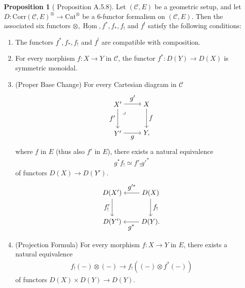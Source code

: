 \documentclass[a4paper,dvipdfmx,11pt,reqno]{amsart}
\DeclareMathOperator{\Hom}{Hom}
\newcommand{\C}{\mathcal{C}}
\newcommand{\Cat}{\mathrm{Cat}}
\newcommand{\Corr}{\mathrm{Corr}}
\theoremstyle{definition}
\newtheorem{proposition}[theorem]{Proposition}
\begin{document}
\begin{proposition}[\cite{Mann22} Proposition A.5.8] \label{Mann.prop.A.5.8}
  Let $(\C,E)$ be a geometric setup, and let $ D : \Corr(\C,E)^{\otimes} \to \Cat^{\otimes}$ be a 6-functor formalism on $(\C,E)$.
  Then the associated six functors $\otimes, \underline{\Hom}, f^{*}, f_{*}, f_{!}$ and $f^{!}$ satisfy the following conditions:
  \begin{enumerate}
    \item The functors $f^{*}, f_{\ast}, f_{!}$ and $f^{!}$ are compatible with composition.
    \item For every morphism $f : X \to Y$ in $\C$, the functor $f^{*} : D(Y) \to D(X)$ is symmetric monoidal.
    \item (Proper Base Change) For every Cartesian diagram in $\C$ 
    \[\begin{tikzpicture}[auto,->] 
      \node (tl) at (0,1.5) {$X'$}; 
      \node (tr) at (1.5,1.5) {$X$};
      \node (bl) at (0,0) {$Y'$}; 
      \node (br) at (1.5,0) {$Y,$}; 
      \draw (tl) -- node {$g'$} (tr); 
      \draw (bl) -- node[swap] {$g$} (br); 
      \draw (tl) -- node[swap] {$f'$} (bl);
      \draw (tr) -- node {$f$} (br); 
      \node at ([xshift=0.0cm, yshift=-0.2cm] tl.south east) {$\lrcorner$};
    \end{tikzpicture}\]
    where $f$ in $E$ (thus also $f'$ in $E$), there exists a natural equivalence
    \begin{align*}
      g^{*}f_{!} \simeq f'_{!}g'^{*}
    \end{align*}
    of functors $D(X) \to D(Y')$.
    \[\begin{tikzpicture}[auto,->] 
      \node (tl) at (0,1.5) {$D(X')$}; 
      \node (tr) at (2,1.5) {$D(X)$};
      \node (bl) at (0,0) {$D(Y')$}; 
      \node (br) at (2,0) {$D(Y).$}; 
      \draw (tr) -- node[swap] {$g'^{*}$} (tl); 
      \draw (br) -- node {$g^{*}$} (bl); 
      \draw (tl) -- node[swap] {$f'_{!}$} (bl);
      \draw (tr) -- node {$f_{!}$} (br); 
    \end{tikzpicture}\]
    \item (Projection Formula) For every morphism $f : X \to Y$ in $E$,
    there exists a natural equivalence
    \begin{align*}
      f_{!}(-) \otimes (-) \to f_{!}((-) \otimes f^{*}(-))
    \end{align*}
    of functors $D(X) \times D(Y) \to D(Y)$.

\end{enumerate}
\end{proposition}
\end{document}
